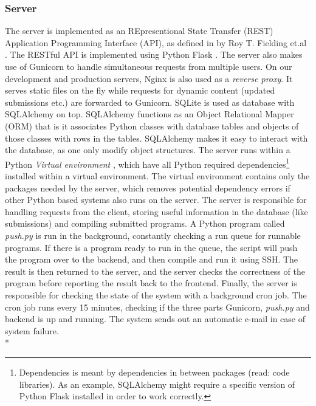 \subsubsection{Server} The server is implemented as an REpresentional State Transfer (REST) Application Programming Interface (API), as defined in by Roy T. Fielding et.al \cite{a:rtf}. The RESTful API is implemented using Python Flask \cite{m:flask}. The server also makes use of Gunicorn \cite{m:guni} to handle simultaneous requests from multiple users. On our development and production servers, Nginx \cite{m:nginx} is also used as a \textit{reverse proxy}. It serves static files on the fly while requests for dynamic content (updated submissions etc.) are forwarded to Gunicorn. SQLite \cite{m:sqlite} is used as database with SQLAlchemy\cite{m:sqlalc} on top. SQLAlchemy functions as an Object Relational Mapper (ORM) that is it associates Python classes with database tables and objects of those classes with rows in the tables. SQLAlchemy makes it easy to interact with the database, as one only modify object structures. The server runs within a Python \textit{Virtual environment} \cite{m:virtualenv}, which have all Python required dependencies\footnote{Dependencies is meant by dependencies in between packages (read: code libraries). As an example, SQLAlchemy might require a specific version of Python Flask installed in order to work correctly.} installed within a virtual environment. The virtual environment contains only the packages needed by the server, which removes potential dependency errors if other Python based systems also runs on the server. The server is responsible for handling requests from the client, storing useful information in the database (like submissions) and compiling submitted programs. A Python program called \textit{push.py} is run in the background, constantly checking a run queue for runnable programs. If there is a program ready to run in the queue, the script will push the program over to the backend, and then compile and run it using SSH. The result is then returned to the server, and the server checks the correctness of the program before reporting the result back to the frontend. Finally, the server is responsible for checking the state of the system with a background cron job. The cron job runs every 15 minutes, checking if the three parts Gunicorn, \textit{push.py} and backend is up and running. The system sends out an automatic e-mail in case of system failure. \\*

